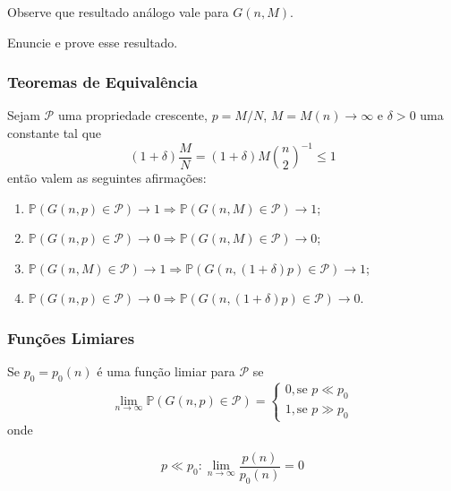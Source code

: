 Observe que resultado análogo vale para $G(n,M)$.
\begin{exercicio}
Enuncie e prove esse resultado.
\end{exercicio}{}

\subsubsection{Teoremas de Equivalência}
\begin{lema}
Sejam $\mathcal{P}$ uma propriedade crescente, $p = M/ N$, $M = M(n) \rightarrow \infty$ e $\delta > 0$ uma constante tal que 
\begin{equation*}
    (1 + \delta)\frac{M}{N} = (1 + \delta)M\binom{n}{2}^{-1} \leq 1
\end{equation*}{}
então valem as seguintes afirmações:
\begin{enumerate}
    \item $\mathbb{P}(G(n,p) \in \mathcal{P}) \rightarrow 1 \Rightarrow \mathbb{P}(G(n, M) \in \mathcal{P}) \rightarrow 1$;
    \item $\mathbb{P}(G(n,p) \in \mathcal{P}) \rightarrow 0 \Rightarrow \mathbb{P}(G(n, M) \in \mathcal{P}) \rightarrow 0$;
    \item $\mathbb{P}(G(n,M) \in \mathcal{P}) \rightarrow 1 \Rightarrow \mathbb{P}(G(n, (1 + \delta)p) \in \mathcal{P}) \rightarrow 1$;
    \item $\mathbb{P}(G(n,p) \in \mathcal{P}) \rightarrow 0 \Rightarrow \mathbb{P}(G(n, (1 + \delta)p) \in \mathcal{P}) \rightarrow 0$.
\end{enumerate}
\end{lema}{}
\subsubsection{Funções Limiares}

\begin{definicao}
Se $p_0 = p_0(n)$ é uma função limiar para $\mathcal{P}$ se
\begin{equation*}
    \lim_{n \rightarrow \infty} \mathbb{P}(G(n, p) \in \mathcal{P}) = \begin{cases}
    0, \text{se } p \ll p_0 \\
    1, \text{se } p \gg p_0
    \end{cases}    
\end{equation*}
onde

\begin{equation*}
    p \ll p_0 : \lim_{n \rightarrow \infty} \frac{p(n)}{p_0(n)} = 0
\end{equation*}
\end{definicao}

